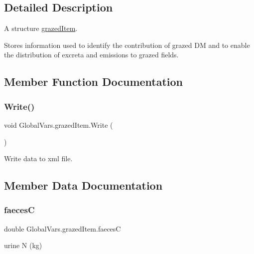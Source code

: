 \subsection{Detailed Description}
A structure \mbox{\hyperlink{struct_global_vars_1_1grazed_item}{grazed\+Item}}. 

Stores information used to identify the contribution of grazed DM and to enable the distribution of excreta and emissions to grazed fields. 

\subsection{Member Function Documentation}
\mbox{\label{struct_global_vars_1_1grazed_item_a5097dcb4a0b6ed484dd0567e058ae9a0}} 
\subsubsection{\texorpdfstring{Write()}{Write()}}
{\footnotesize\ttfamily void Global\+Vars.\+grazed\+Item.\+Write (\begin{DoxyParamCaption}{ }\end{DoxyParamCaption})\hspace{0.3cm}{\ttfamily [inline]}}



Write data to xml file. 



\subsection{Member Data Documentation}
\mbox{\label{struct_global_vars_1_1grazed_item_a8b81ce35a4a1cda5e92772f4d4fab8dd}} 
\subsubsection{\texorpdfstring{faecesC}{faecesC}}
{\footnotesize\ttfamily double Global\+Vars.\+grazed\+Item.\+faecesC}



urine N (kg) 

